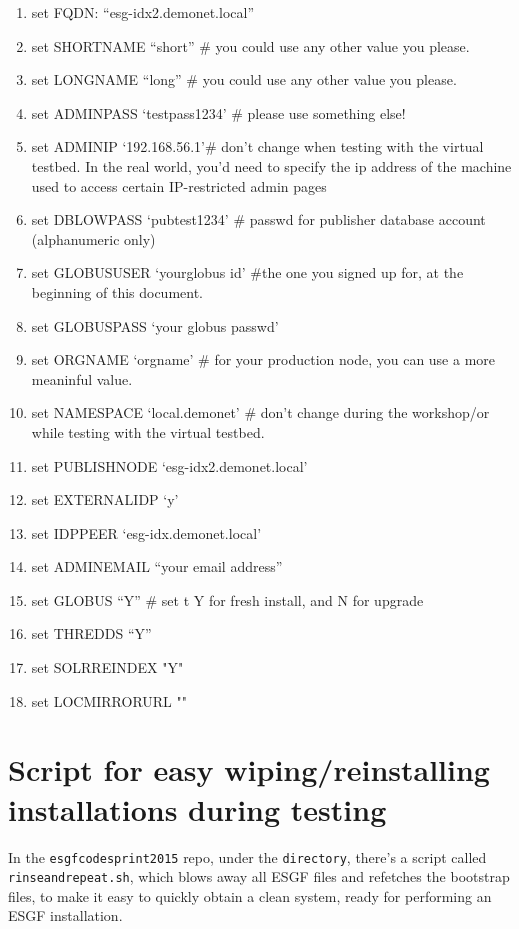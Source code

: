 \begin{enumerate}
\def\labelenumi{\arabic{enumi}.}
\item
  set FQDN: ``esg-idx2.demonet.local''
\item
  set SHORTNAME ``short'' \# you could use any other value you please.
\item
  set LONGNAME ``long'' \# you could use any other value you please.
\item
  set ADMINPASS `testpass1234' \# please use something else!
\item
  set ADMINIP `192.168.56.1'\# don't change when testing with the virtual testbed. In the real world, you'd need to specify the ip address of the machine used to access certain IP-restricted admin pages
\item
  set DBLOWPASS `pubtest1234' \# passwd for publisher database account
  (alphanumeric only)
\item
  set GLOBUSUSER `yourglobus id' \#the one you signed up for, at the
  beginning of this document.
\item
  set GLOBUSPASS `your globus passwd'
\item
  set ORGNAME `orgname' \# for your production node, you can use a more
  meaninful value.
\item
  set NAMESPACE `local.demonet' \# don't change during the workshop/or while testing with the virtual testbed.
\item
  set PUBLISHNODE `esg-idx2.demonet.local'
\item
  set EXTERNALIDP `y'
\item
  set IDPPEER `esg-idx.demonet.local'
\item
  set ADMINEMAIL ``your email address''
\item
  set GLOBUS ``Y'' \# set t Y for fresh install, and N for upgrade
\item
  set THREDDS ``Y''
\item 
  set SOLRREINDEX "Y"
\item 
  set LOCMIRRORURL ""
\end{enumerate}

\section{Script for easy wiping/reinstalling installations during testing}
In the \texttt{esgfcodesprint2015} repo, under the \texttt{directory}, there's a script called \texttt{rinseandrepeat.sh}, which blows away all ESGF files and refetches the bootstrap files, to make it easy to quickly obtain a clean system, ready for performing an ESGF installation.  
